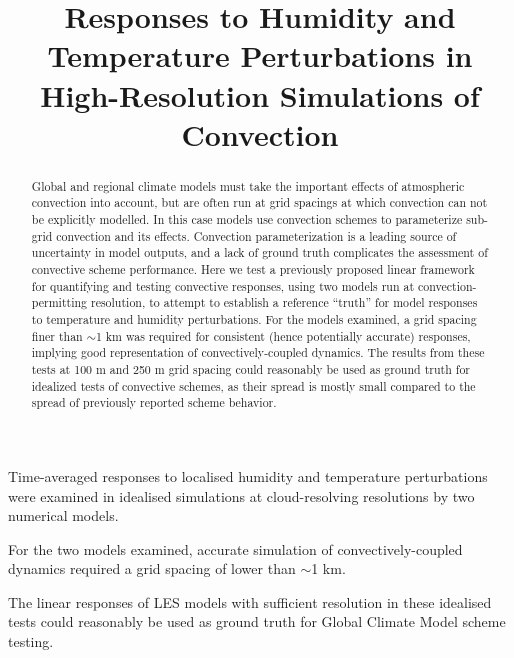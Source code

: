 \documentclass[draft]{agujournal2019}
\begin{document}
\title{Responses to Humidity and Temperature Perturbations in High-Resolution Simulations of Convection}




\begin{keypoints}
    \item Time-averaged responses to localised humidity and temperature perturbations were examined
    in idealised simulations at cloud-resolving resolutions by two numerical models.
    \item For the two models examined, accurate simulation of
    convectively-coupled dynamics required a grid spacing of lower than $\sim$1
    km.
    \item The linear responses of LES models with sufficient resolution in these
    idealised tests could reasonably be used as ground truth for Global Climate
    Model scheme testing.
\end{keypoints}

\justifying

\begin{abstract}
Global and regional climate models must take the important effects of
atmospheric convection into account, but are often run at grid spacings at which
convection can not be explicitly modelled. In this case models use convection
schemes to parameterize sub-grid convection and its effects. Convection
parameterization is a leading source of uncertainty in model outputs, and a lack
of ground truth complicates the assessment of convective scheme performance.
Here we test a previously proposed linear framework for quantifying and testing convective responses, using two models run at convection-permitting resolution, to attempt
to establish a reference ``truth'' for model responses to temperature and
humidity perturbations. For the models examined, a grid spacing finer than $\sim$1 km was required for consistent (hence potentially accurate) responses, implying good representation of
convectively-coupled dynamics. The results from these tests at 100 m and 250 m
grid spacing could reasonably be used as ground truth for idealized tests of convective schemes, as their spread is mostly small compared to the spread of previously reported scheme behavior.
\end{abstract}
\end{document}
